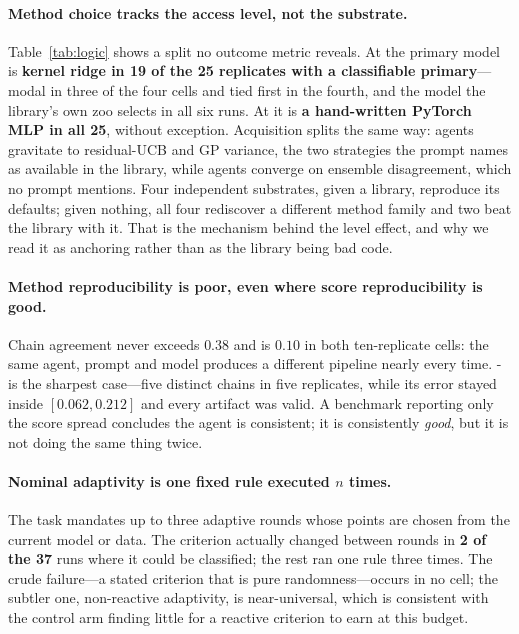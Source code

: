 \paragraph{Method choice tracks the access level, not the substrate.}
Table~\ref{tab:logic} shows a split no outcome metric reveals. At \Ltwo{} the
primary model is \textbf{kernel ridge in 19 of the 25 replicates with a
classifiable primary}---modal in three of the four cells and tied first in the
fourth, and the model the library's own zoo selects in all six \Lzero{} runs.
At \Lthree{} it is \textbf{a hand-written PyTorch MLP in all 25}, without
exception. Acquisition splits the same way: \Ltwo{} agents gravitate to
residual-UCB and GP variance, the two strategies the \Ltwo{} prompt names as
available in the library, while \Lthree{} agents converge on ensemble
disagreement, which no prompt mentions. Four independent substrates, given a
library, reproduce its defaults; given nothing, all four rediscover a different
method family and two beat the library with it. That is the mechanism behind the
level effect, and why we read it as anchoring rather than as the library being
bad code.

\paragraph{Method reproducibility is poor, even where score reproducibility is good.}
Chain agreement never exceeds $0.38$ and is $0.10$ in both ten-replicate cells:
the same agent, prompt and model produces a different pipeline nearly every
time. \Lthree{}- is the sharpest case---five distinct chains in five
replicates, while its error stayed inside $[0.062, 0.212]$ and every artifact
was valid. A benchmark reporting only the score spread concludes the agent is
consistent; it is consistently \emph{good}, but it is not doing the same thing
twice.

\paragraph{Nominal adaptivity is one fixed rule executed $n$ times.}
The task mandates up to three adaptive rounds whose points are chosen from the
current model or data. The criterion actually changed between rounds in
\textbf{2 of the 37} runs where it could be classified; the rest ran one rule
three times. The crude failure---a stated criterion that is pure
randomness---occurs in no cell; the subtler one, non-reactive adaptivity, is near-universal,
which is consistent with the control arm finding little for a reactive
criterion to earn at this budget.

